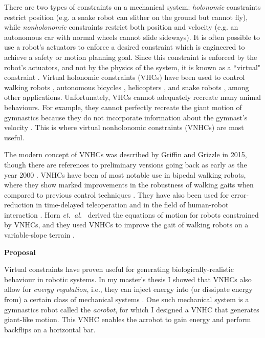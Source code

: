\documentclass[a4paper,12pt]{article}
\begin{document}
There are two types of constraints on a mechanical system:
\textit{holonomic} constraints restrict position (e.g. a snake robot can slither
on the ground but cannot fly),
while \textit{nonholonomic} constraints restrict both position and
velocity (e.g. an autonomous car with normal wheels cannot slide sideways).
It is often possible to use a robot's actuators to enforce a desired constraint
which is engineered to achieve a safety or motion planning goal.
Since this constraint is enforced by the robot's actuators, and not by the
physics of the system, it is known as a ``virtual" constraint
\cite{vhcs_for_el_systems}.
Virtual holonomic constraints (VHCs) have been used to control walking robots
\cite{stable_walking}, autonomous bicycles \cite{bicycle},
helicopters \cite{helicopter}, and snake robots \cite{snake_robot},
among other applications.
Unfortunately, VHCs cannot adequately recreate many animal behaviours.
For example, they cannot perfectly recreate the giant motion of gymnastics 
because they do not incorporate information about the gymnast's velocity
\cite{xingbo_thesis}.
This is where virtual nonholonomic constraints (VNHCs) are most useful.

The modern concept of VNHCs was described by
Griffin and Grizzle \cite{nhvc_dynamic_walking} in 2015, though there are
references to preliminary versions going back as early as the year 2000
\cite{vnhc_human_robot_coop}.
VNHCs have been of most notable use in bipedal walking robots,
where they show marked improvements in the robustness of walking gaits
when compared to previous control techniques
\cite{nhvc_gait_optimization,output_nhvc_bipedal_control}.
They have also been used for error-reduction in time-delayed teleoperation
\cite{vnhc_time_delay_teleop} and in the field of human-robot interaction
\cite{psd_based_vnhc_redundant_manipulator,haptic_vnhc}.
Horn \textit{et.~al.}~\cite{hybrid_zero_dynamics_bipedal_nhvcs} derived the 
equations of motion for robots constrained by VNHCs, and they used VNHCs to
improve the gait of walking robots on a variable-slope terrain
\cite{nhvc_incline_walking}.

\begin{large} \textbf{Proposal} \end{large}

Virtual constraints have proven useful for generating biologically-realistic
behaviour in robotic systems.
In my master's thesis I showed that VNHCs also allow for 
\textit{energy regulation}, i.e., they can inject energy into (or dissipate
energy from) a certain class of mechanical systems \cite{my-thesis}.
One such mechanical system is a gymnastics robot called the
\textit{acrobot}, for which I designed a VNHC that generates giant-like motion. 
This VNHC enables the acrobot to gain energy and perform backflips on a
horizontal bar.
\end{document}
